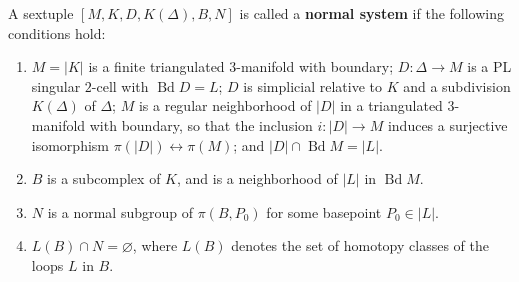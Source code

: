 A sextuple $[M, K, D, K(\Delta), B, N]$ is called a \textbf{normal system} if the following conditions hold:

\begin{enumerate}
  \item $M = |K|$ is a finite triangulated $3$-manifold with boundary; $D: \Delta \to M$ is a PL singular $2$-cell with $\operatorname{Bd} D = L$; $D$ is simplicial relative to $K$ and a subdivision $K(\Delta)$ of $\Delta$; $M$ is a regular neighborhood of $|D|$ in a triangulated $3$-manifold with boundary, so that the inclusion $i: |D| \to M$ induces a surjective isomorphism $\pi(|D|) \leftrightarrow \pi(M)$; and $|D| \cap \operatorname{Bd} M = |L|$.

  \item $B$ is a subcomplex of $K$, and is a neighborhood of $|L|$ in $\operatorname{Bd} M$.

  \item $N$ is a normal subgroup of $\pi(B, P_0)$ for some basepoint $P_0 \in |L|$.

  \item $L(B) \cap N = \varnothing$, where $L(B)$ denotes the set of homotopy classes of the loops $L$ in $B$.
\end{enumerate}
